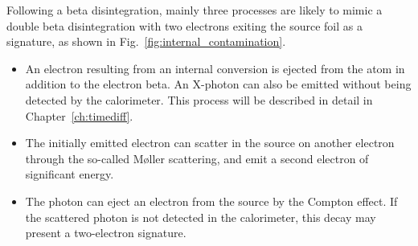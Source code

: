 Following a beta disintegration, mainly three processes are likely to mimic a double beta disintegration with two electrons exiting the source foil as a signature, as shown in Fig.~\ref{fig:internal_contamination}.
\begin{itemize}
\item An electron resulting from an internal conversion is ejected from the atom in addition to the electron  beta.
An X-photon can also be emitted without being detected by the calorimeter.
This process will be described in detail in Chapter~\ref{ch:timediff}.
\item The initially emitted electron can scatter in the source on another electron through the so-called M\o{}ller scattering, and emit a second electron of significant energy.
\item The photon can eject an electron from the source by the Compton effect.
If the scattered photon is not detected in the calorimeter, this decay may present a two-electron signature.
\end{itemize}
